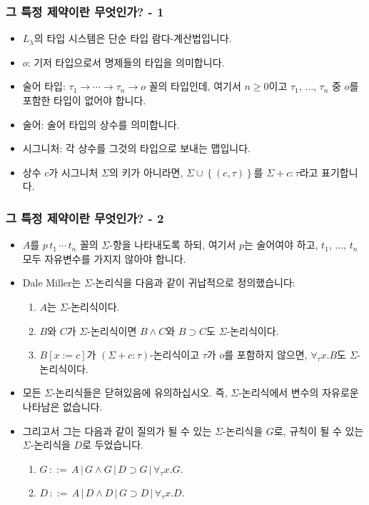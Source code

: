 \documentclass[slidestop,compress,mathserif]{beamer}
\begin{document}
    \begin{frame}
        \frametitle{그 특정 제약이란 무엇인가? - 1}
        \begin{itemize}
            \item $L_\lambda$의 타입 시스템은 단순 타입 람다-계산법입니다.
            \item $o$: 기저 타입으로서 명제들의 타입을 의미합니다.
            \item 술어 타입: $\tau_1 \to \cdots \to \tau_n \to o$ 꼴의 타입인데, 여기서 $n \geq 0$이고 $\tau_1$, ..., $\tau_n$ 중 $o$를 포함한 타입이 없어야 합니다.
            \item 술어: 술어 타입의 상수를 의미합니다.
            \item 시그니처: 각 상수를 그것의 타입으로 보내는 맵입니다.
            \item 상수 $c$가 시그니처 $\Sigma$의 키가 아니라면, $\Sigma \cup \left\{ \left( c , \tau \right) \right\} $를 $\Sigma + c : \tau$라고 표기합니다.
        \end{itemize}
    \end{frame}

    \begin{frame}
        \frametitle{그 특정 제약이란 무엇인가? - 2}
        \begin{itemize}
            \item $A$를 $p \, t_1 \, \cdots \, t_n$ 꼴의 $\Sigma$-항을 나타내도록 하되, 여기서 $p$는 술어여야 하고, $t_1$, ..., $t_n$ 모두 자유변수를 가지지 않아야 합니다.
            \item Dale Miller는 $\Sigma$-논리식을 다음과 같이 귀납적으로 정의했습니다:
            \begin{enumerate}
                \item $A$는 $\Sigma$-논리식이다.
                \item $B$와 $C$가 $\Sigma$-논리식이면 $B \land C$와 $B \supset C$도 $\Sigma$-논리식이다.
                \item $B \left[ x := c \right]$가 $\left( \Sigma + c : \tau \right)$-논리식이고 $\tau$가 $o$를 포함하지 않으면, $\forall_{\tau} x . B$도 $\Sigma$-논리식이다.
            \end{enumerate}
            \item 모든 $\Sigma$-논리식들은 닫혀있음에 유의하십시오. 즉, $\Sigma$-논리식에서 변수의 자유로운 나타남은 없습니다.
            \item 그리고서 그는 다음과 같이 질의가 될 수 있는 $\Sigma$-논리식을 $G$로, 규칙이 될 수 있는 $\Sigma$-논리식을 $D$로 두었습니다.
            \begin{enumerate}
                \item $G \, ::= \, A \, | \, G \land G \, | \, D \supset G \, | \, \forall_{\tau} x . G$.
                \item $D \, ::= \, A \, | \, D \land D \, | \, G \supset D \, | \, \forall_{\tau} x . D$.
            \end{enumerate}
        \end{itemize}
    \end{frame}
\end{document}
